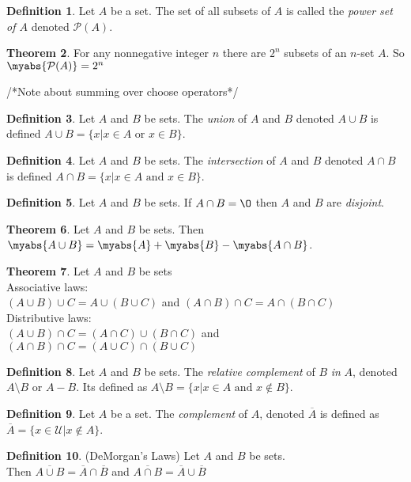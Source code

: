 \documentclass[11pt]{article}
\theoremstyle{definition}
\newtheorem{theorem}{Theorem}[section]
\newtheorem{definition}[theorem]{Definition}
\begin{document}
\begin{definition}
    Let $A$ be a set. The set of all subsets of $A$ is called the
    \emph{power set of $A$} denoted $\mathcal{P}(A)$.
\end{definition}
\begin{theorem}
    For any nonnegative integer $n$ there are $2^n$ subsets of an $n$-set $A$. So $\myabs{\mathcal{P}(A)} = 2^n$
    \label{thm:power_combos}
\end{theorem}
/*Note about summing over choose operators*/
\begin{definition}
    Let $A$ and $B$ be sets. The \emph{union} of $A$ and $B$ denoted $A \cup B$ is defined $A \cup B = \{ x \vert x \in A \text{ or } x \in B \}$.
\end{definition}
\begin{definition}
    Let $A$ and $B$ be sets. The \emph{intersection} of $A$ and $B$ denoted $A \cap B$ is defined $A \cap B = \{ x \vert x \in A \text{ and } x \in B \}$.
\end{definition}
\begin{definition}
    Let $A$ and $B$ be sets. If $A \cap B = \O$ then $A$ and $B$ are \emph{disjoint}.
\end{definition}
\begin{theorem}
    Let $A$ and $B$ be sets. Then $\myabs{A \cup B} = \myabs{A} + \myabs{B} - \myabs{A \cap B}$.
\end{theorem}
\begin{theorem} 
    Let $A$ and $B$ be sets \\ Associative laws:\\
    $(A \cup B) \cup C = A \cup (B \cup C)$ and 
    $(A \cap B) \cap C = A \cap (B \cap C)$ \\
    Distributive laws:\\
    $(A \cup B) \cap C = (A \cap C) \cup (B \cap C)$ and
    $(A \cap B) \cap C = (A \cup C) \cap (B \cup C)$
\end{theorem}
\begin{definition}
    Let $A$ and $B$ be sets. The \emph{relative complement} of $B$ \emph{in} $A$, denoted $A \setminus B$ or $A - B$. Its defined as $A \setminus B = \{ x \vert x \in A \text{ and } x \notin B \}$.
\end{definition}
\begin{definition}
    Let $A$ be a set. The \emph{complement} of $A$, denoted $\overline{A}$ is defined as $\overline{A} = \{ x \in \mathcal{U} \vert x \notin A \}$.
\end{definition}
\begin{definition} (DeMorgan's Laws) Let $A$ and $B$ be sets. \\
    Then $\overline{A \cup B} = \overline{A} \cap \overline{B}$ and $\overline{A \cap B} = \overline{A} \cup \overline{B}$
\end{definition}
\end{document}
